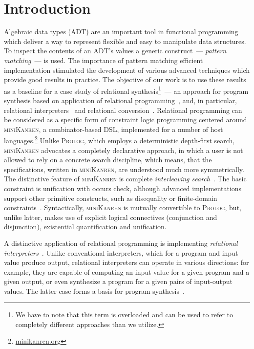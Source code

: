 \section{Introduction}
\label{sec:intro}

Algebraic data types (ADT) are an important tool in functional programming which deliver a way to represent flexible and easy to manipulate data structures.
To inspect the contents of an ADT's values a generic construct~--- \emph{pattern matching}~--- is used. The importance of pattern matching efficient
implementation stimulated the development of various advanced techniques which provide good results in practice. The objective of our work is to use these
results as a baseline for a case study of relational synthesis\footnote{We have to note that this term is overloaded and can be used to refer to completely
different approaches than we utilize.}~--- an approach for program synthesis based on application of relational programming~\cite{TRS,WillThesis}, and,
in particular, relational interpreters~\cite{unified} and relational conversion~\cite{conversion}. Relational programming can be considered as a specific form
of constraint logic programming centered around \textsc{miniKanren}, a combinator-based DSL, implemented for a number of host languages.\footnote{\url{minikanren.org}}
Unlike \textsc{Prolog}, which employs a deterministic depth-first search, \textsc{miniKanren} advocates a completely declarative approach, in which a user is not
allowed to rely on a concrete search discipline, which means, that the specifications, written in \textsc{miniKanren}, are understood much more symmetrically.
The distinctive feature of \textsc{miniKanren} is complete \emph{interleaving search}~\cite{search}. The basic constraint is unification with occurs check, although
advanced implementations support other primitive constructs, such as disequality or finite-domain constraints~\cite{CKanren}. Syntactically, \textsc{miniKanren} is mutually
convertible to \textsc{Prolog}, but, unlike latter, makes use of explicit logical connectives (conjunction and disjunction), existential quantification and unification.

A distinctive application of relational programming is implementing \emph{relational interpreters}~\cite{Untagged}. Unlike conventional interpreters, which for a program and
input value produce output, relational interpreters can operate in various directions: for example, they are capable of computing an input value for a given
program and a given output, or even synthesize a program for a given pairs of input-output values. The latter case forms a basis for program synthesis~\cite{unified,eigen}.

